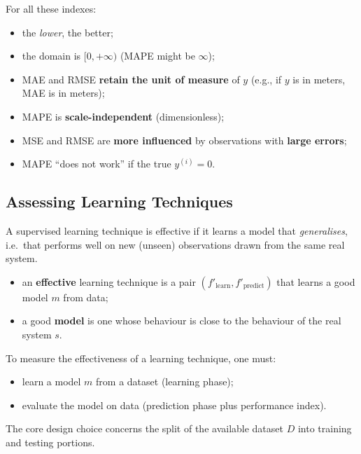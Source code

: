 For all these indexes:
\begin{itemize}
  \item the \emph{lower}, the better;
  \item the domain is $[0, +\infty)$ (MAPE might be $\infty$);
  \item MAE and RMSE \textbf{retain the unit of measure} of $y$ (e.g., if $y$ is in meters, MAE is in meters);
  \item MAPE is \textbf{scale-independent} (dimensionless);
  \item MSE and RMSE are \textbf{more influenced} by observations with \textbf{large errors};
  \item MAPE ``does not work'' if the true $y^{(i)} = 0$.
\end{itemize}

\subsection{Assessing Learning Techniques}
\label{subsec:assessing-learning-techniques}

A supervised learning technique is effective if it learns a model that \emph{generalises}, i.e.\ that performs well on new (unseen) observations drawn from the same real system.

\begin{itemize}[noitemsep]
    \item an \textbf{effective} learning technique is a pair $(f'_{\text{learn}}, f'_{\text{predict}})$ that learns a good model $m$ from data;
    \item a good \textbf{model} is one whose behaviour is close to the behaviour of the real system $s$.
\end{itemize}

To measure the effectiveness of a learning technique, one must:
\begin{itemize}[noitemsep]
    \item learn a model $m$ from a dataset (learning phase);
    \item evaluate the model on data (prediction phase plus performance index).
\end{itemize}
The core design choice concerns the split of the available dataset $D$ into training and testing portions.

